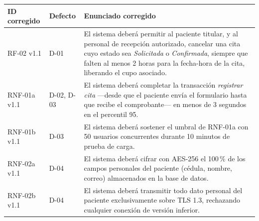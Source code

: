 \documentclass[11pt,a4paper,oneside]{article}
\begin{document}
	{\footnotesize
		\begin{center}
			\begin{tabularx}{\textwidth}{|C{1.5cm}|C{1.2cm}|Y|}
				\hline
				\textbf{ID corregido} & \textbf{Defecto} & \textbf{Enunciado corregido} \\ \hline
				RF-02 v1.1 & D-01 & El sistema deberá permitir al paciente titular, y al personal de recepción autorizado, cancelar una cita cuyo estado sea \emph{Solicitada} o \emph{Confirmada}, siempre que falten al menos 2 horas para la fecha-hora de la cita, liberando el cupo asociado. \\ \hline
				RNF-01a v1.1 & D-02, D-03 & El sistema deberá completar la transacción \emph{registrar cita} —desde que el paciente envía el formulario hasta que recibe el comprobante— en menos de 3 segundos en el percentil 95. \\ \hline
				RNF-01b v1.1 & D-03 & El sistema deberá sostener el umbral de RNF-01a con 50 usuarios concurrentes durante 10 minutos de prueba de carga. \\ \hline
				RNF-02a v1.1 & D-04 & El sistema deberá cifrar con AES-256 el 100\,\% de los campos personales del paciente (cédula, nombre, correo) almacenados en la base de datos. \\ \hline
				RNF-02b v1.1 & D-04 & El sistema deberá transmitir todo dato personal del paciente exclusivamente sobre TLS 1.3, rechazando cualquier conexión de versión inferior. \\ \hline
			\end{tabularx}
	\end{center}}
	
	\newpage
	\vspace{4pt}
	
\end{document}
